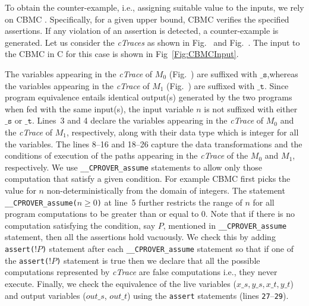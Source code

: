 To obtain the counter-example, i.e., assigning 
suitable value to the inputs, we rely on CBMC \cite{Clarke04CBMC} . 
Specifically, for a given upper bound, CBMC verifies the specified  assertions. If any violation of an
assertion is detected, a counter-example is generated. Let us consider the 
\textit{cTraces} as shown in Fig.~ and Fig.~. The input to the CBMC in C 
for this case is shown in Fig~\ref{Fig:CBMCInput}. 

The variables appearing in the \textit{cTrace} of $M_0$
(Fig.~) are suffixed with $\mathtt{\_s}$,whereas 
the variables appearing in the \textit{cTrace} of $M_1$ (Fig.~) are
suffixed with $\mathtt{\_t}$. Since program equivalence entails identical output(s)
generated by the two programs when fed with the same input(s), the input variable
$n$ is not suffixed with either $\mathtt{\_s}$ or $\mathtt{\_t}$. Lines~3 and 4
declare the variables appearing in the \textit{cTrace} of $M_0$ and the
\textit{cTrace} of $M_1$, respectively, along with their data type which is
integer for all the variables. The lines 8--16 and 18--26 capture the data
transformations and the conditions of execution of the paths appearing in the
\textit{cTrace} of the $M_0$ and $M_1$, respectively. We use
\texttt{\_\_CPROVER\_assume} statements to allow only those computation
that satisfy a given condition. For example CBMC first picks the value for $n$
non-deterministically from the domain of integers. The statement
\texttt{\_\_CPROVER\_assume($n\geq 0$)} at line~5 further restricts the range
of $n$ for all program computations to be greater than or equal to 0. Note that
if there is no computation satisfying the condition, say $P$, mentioned in
\texttt{\_\_CPROVER\_assume} statement, then all the assertions hold
vacuously. We check this by adding \texttt{assert($!P$)} statement after each
\texttt{\_\_CPROVER\_assume} statement so that if one of the
\texttt{assert($!P$)} statement is true then we declare that all the possible
computations represented by \textit{cTrace} are false computations
\cite{Chouksey17} i.e., they never execute. Finally, we check the equivalence
of the live variables  ($x\_s,y\_s,x\_t,y\_t$) and output variables ($\mathit{out\_s}$,
$\mathit{out\_t}$) using  the \texttt{assert} statements (lines
\texttt{27}--\texttt{29}).


